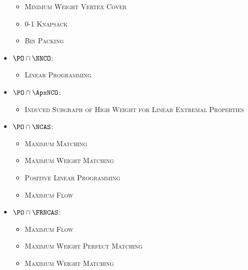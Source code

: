 \documentclass{article}
\begin{document}
\begin{itemize}
\begin{itemize}
  \item \textsc{Minimum Weight Vertex Cover} \cite[Theorem~5.3.6]{dsst97}
  \item \textsc{0-1 Knapsack} \cite[Theorem~2]{mayr88}
  \item \textsc{Bin Packing} \cite[Theorem~3]{mayr88}
  \end{itemize}
\item $\PO \cap \NNCO$:
  \begin{itemize}
  \item \textsc{Linear Programming}
  \end{itemize}
\item $\PO \cap \ApxNCO$:
  \begin{itemize}
  \item \textsc{Induced Subgraph of High Weight for Linear Extremal Properties} \cite{dsst97}
  \end{itemize}
\item $\PO \cap \NCAS$:
  \begin{itemize}
  \item \textsc{Maximum Matching} \cite[Theorem~5.2.1]{dsst97}
  \item \textsc{Maximum Weight Matching} \cite[Theorem~5.2.2]{dsst97}
  \item \textsc{Positive Linear Programming} \cite[Theorem~5.1.11]{dsst97} \cite{tx98}
  \item \textsc{Maximum Flow} \cite[Theorem~5.2.2]{dsst97}
  \end{itemize}
\item $\PO \cap \FRNCAS$:
  \begin{itemize}
  \item \textsc{Maximum Flow} \cite[Theorem~4.5.2]{dsst97}
  \item \textsc{Maximum Weight Perfect Matching} \cite[Theorem~4.5.2]{dsst97}
  \item \textsc{Maximum Weight Matching} \cite[Theorem~4.5.2]{dsst97}
  \end{itemize}
\end{itemize}



\end{document}
